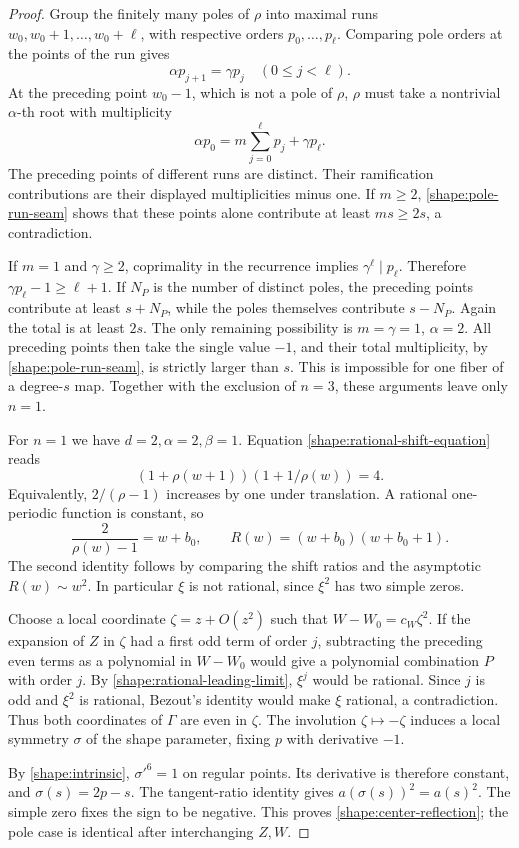 \begin{proof}
Group the finitely many poles of \(\rho\) into maximal runs
\(w_0,w_0+1,\ldots,w_0+\ell\), with respective orders
\(p_0,\ldots,p_\ell\). Comparing pole orders at the points of the
run gives
\[
 \alpha p_{j+1}=\gamma p_j\quad(0\leq j<\ell).
\]
At the preceding point \(w_0-1\), which is not a pole of \(\rho\),
\(\rho\) must take a nontrivial \(\alpha\)-th root with multiplicity
\begin{equation}
 \alpha p_0=m\sum_{j=0}^\ell p_j+\gamma p_\ell.
 \label{shape:pole-run-seam}
\end{equation}
The preceding points of different runs are distinct. Their
ramification contributions are their displayed multiplicities minus
one. If \(m\geq2\), \eqref{shape:pole-run-seam} shows that these
points alone contribute at least \(ms\geq2s\), a contradiction.

If \(m=1\) and \(\gamma\geq2\), coprimality in the recurrence
implies \(\gamma^\ell\mid p_\ell\). Therefore
\(\gamma p_\ell-1\geq\ell+1\). If \(N_P\) is the number of
distinct poles, the preceding points contribute at least \(s+N_P\),
while the poles themselves contribute \(s-N_P\). Again the total is
at least \(2s\). The only remaining possibility is
\(m=\gamma=1\), \(\alpha=2\). All preceding points then take the
single value \(-1\), and their total multiplicity, by
\eqref{shape:pole-run-seam}, is strictly larger than \(s\). This is
impossible for one fiber of a degree-\(s\) map. Together with the
exclusion of \(n=3\), these arguments leave only \(n=1\).

For \(n=1\) we have \(d=2,\alpha=2,\beta=1\). Equation
\eqref{shape:rational-shift-equation} reads
\[
 (1+\rho(w+1))(1+1/\rho(w))=4.
\]
Equivalently, \(2/(\rho-1)\) increases by one under translation.
A rational one-periodic function is constant, so
\[
 \frac{2}{\rho(w)-1}=w+b_0,
 \qquad R(w)=(w+b_0)(w+b_0+1).
\]
The second identity follows by comparing the shift ratios and the
asymptotic \(R(w)\sim w^2\). In particular \(\xi\) is not rational,
since \(\xi^2\) has two simple zeros.

Choose a local coordinate \(\zeta=z+O(z^2)\) such that
\(W-W_0=c_W\zeta^2\). If the expansion of \(Z\) in \(\zeta\)
had a first odd term of order \(j\), subtracting the preceding even
terms as a polynomial in \(W-W_0\) would give a polynomial
combination \(P\) with order \(j\). By
\eqref{shape:rational-leading-limit}, \(\xi^j\) would be rational.
Since \(j\) is odd and \(\xi^2\) is rational, Bezout's identity would
make \(\xi\) rational, a contradiction. Thus both coordinates of
\(\Gamma\) are even in \(\zeta\). The involution
\(\zeta\mapsto-\zeta\) induces a local symmetry \(\sigma\) of the
shape parameter, fixing \(p\) with derivative \(-1\).

By \eqref{shape:intrinsic}, \(\sigma'^6=1\) on regular points.
Its derivative is therefore constant, and \(\sigma(s)=2p-s\).
The tangent-ratio identity gives \(a(\sigma(s))^2=a(s)^2\).
The simple zero fixes the sign to be negative. This proves
\eqref{shape:center-reflection}; the pole case is identical after
interchanging \(Z,W\).
\end{proof}

